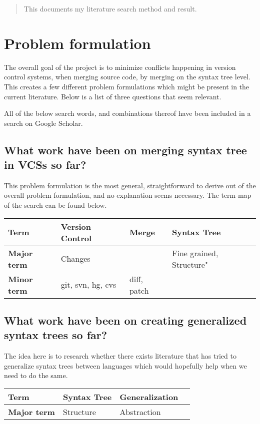 \documentclass[12pt]{article}
\begin{document}
\maketitle

\begin{abstract}
This documents my literature search method and result.
\end{abstract}

\section{Problem formulation}
The overall goal of the project is to minimize conflicts happening in version control systems, when merging source code, by merging on the syntax tree level. This creates a few different problem formulations which might be present in the current literature. Below is a list of three questions that seem relevant.

All of the below search words, and combinations thereof have been included in a search on Google Scholar.

\subsection{What work have been on merging syntax tree in VCSs so far?}
This problem formulation is the most general, straightforward to derive out of the overall problem formulation, and no explanation seems necessary. The term-map of the search can be found below.

\begin{tabular}{ | l | l | l | l |}
    \hline
    \textbf{Term} & Version Control & Merge & Syntax Tree \\ \hline
    \textbf{Major term} & Changes & & Fine grained, Structure" \\ \hline
    \textbf{Minor term} & git, svn, hg, cvs  & diff, patch & \\ \hline
\end{tabular}

\subsection{What work have been on creating generalized syntax trees so far?}
The idea here is to research whether there exists literature that has tried to generalize syntax trees between languages which would hopefully help when we need to do the same.

\begin{tabular}{ | l | l | l | l |}
    \hline
    \textbf{Term} & Syntax Tree & Generalization \\ \hline
    \textbf{Major term} & Structure & Abstraction \\ \hline
\end{tabular}
\end{document}
